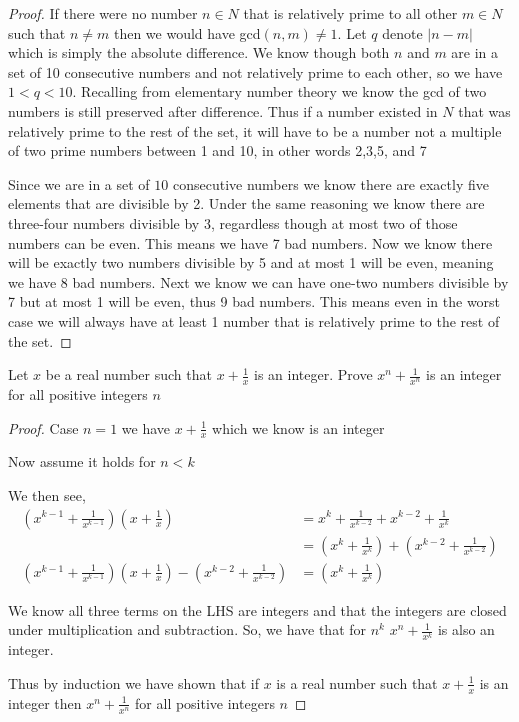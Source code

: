 \documentclass[11pt]{article}
\newenvironment{problem}[2][Problem\!]{\begin{trivlist}
\item[\hskip \labelsep {\bfseries #1}\hskip \labelsep {\bfseries #2}]}{\end{trivlist}}
\begin{document}
\begin{proof}
    If there were no number $n\in N$ that is relatively prime to all other $m\in N$ such that $n\neq m$ then we would have gcd$(n,m) \neq 1$. Let $q$ denote $|n-m|$ which is simply the absolute difference. We know though both $n$ and $m$ are in a set of 10 consecutive numbers and not relatively prime to each other, so we have $1 < q < 10$. Recalling from elementary number theory we know the gcd of two numbers is still preserved after difference. Thus if a number existed in $N$ that was relatively prime to the rest of the set, it will have to be a number not a multiple of two prime numbers between 1 and 10, in other words 2,3,5, and 7 

    Since we are in a set of $10$ consecutive numbers we know there are exactly five elements that are divisible by 2. Under the same reasoning we know there are three-four numbers divisible by 3, regardless though at most two of those numbers can be even. This means we have 7 bad numbers. Now we know there will be exactly two numbers divisible by 5 and at most 1 will be even, meaning we have 8 bad numbers. Next we know we can have one-two numbers divisible by 7 but at most 1 will be even, thus 9 bad numbers. This means even in the worst case we will always have at least 1 number that is relatively prime to the rest of the set. 
\end{proof}
\newpage
\begin{tcolorbox}
    \begin{problem}{IC 9/29 14.}
        Let $x$ be a real number such that $x + \frac{1}{x}$ is an integer. Prove $x^n + \frac{1}{x^n}$ is an integer for all positive integers $n$
    \end{problem}
\end{tcolorbox}
\begin{proof}
    Case $n = 1$ we have $x + \frac{1}{x}$ which we know is an integer

    Now assume it holds for $n < k$

    We then see,
    \begin{align*}
        (x^{k-1} + \frac{1}{x^{k-1}})(x + \frac{1}{x}) &= x^k + \frac{1}{x^{k-2}} + x^{k-2} + \frac{1}{x^k} \\
        &= (x^k + \frac{1}{x^k})+(x^{k-2}+\frac{1}{x^{k-2}}) \\
        (x^{k-1} + \frac{1}{x^{k-1}})(x + \frac{1}{x}) - (x^{k-2}+\frac{1}{x^{k-2}}) &= (x^k + \frac{1}{x^k})
    \end{align*}

    We know all three terms on the LHS are integers and that the integers are closed under multiplication and subtraction. So, we have that for $n ^k$ $x^n + \frac{1}{x^k}$ is also an integer. 

    Thus by induction we have shown that if $x$ is a real number such that $x + \frac{1}{x}$ is an integer then $x^n + \frac{1}{x^n}$ for all positive integers $n$ 
\end{proof}
\end{document}
